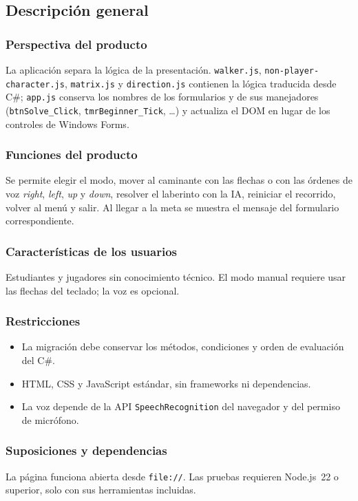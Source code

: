 \documentclass[12pt,a4paper]{article}
\begin{document}
\subsection{Descripción general}

\subsubsection{Perspectiva del producto}
La aplicación separa la lógica de la presentación. \texttt{walker.js},
\texttt{non-player-character.js}, \texttt{matrix.js} y \texttt{direction.js}
contienen la lógica traducida desde C\#; \texttt{app.js} conserva los nombres de
los formularios y de sus manejadores (\texttt{btnSolve\_Click},
\texttt{tmrBeginner\_Tick}, \ldots) y actualiza el DOM en lugar de los controles
de Windows Forms.

\subsubsection{Funciones del producto}
Se permite elegir el modo, mover al caminante con las flechas o con las órdenes de
voz \emph{right}, \emph{left}, \emph{up} y \emph{down}, resolver el laberinto con
la IA, reiniciar el recorrido, volver al menú y salir. Al llegar a la meta se
muestra el mensaje del formulario correspondiente.

\subsubsection{Características de los usuarios}
Estudiantes y jugadores sin conocimiento técnico. El modo manual requiere usar
las flechas del teclado; la voz es opcional.

\subsubsection{Restricciones}
\begin{itemize}
  \item La migración debe conservar los métodos, condiciones y orden de evaluación del C\#.
  \item HTML, CSS y JavaScript estándar, sin frameworks ni dependencias.
  \item La voz depende de la API \texttt{SpeechRecognition} del navegador y del permiso de micrófono.
\end{itemize}

\subsubsection{Suposiciones y dependencias}
La página funciona abierta desde \texttt{file://}. Las pruebas requieren Node.js~22
o superior, solo con sus herramientas incluidas.
\end{document}
